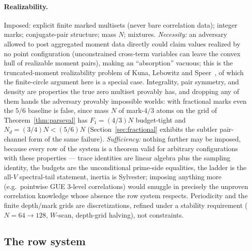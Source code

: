 \documentclass[11pt]{article}
\theoremstyle{plain}
\theoremstyle{definition}
\theoremstyle{remark}
\newcommand{\Nd}{N_{d}}
\begin{document}
\paragraph{Realizability.}
Imposed: explicit finite marked multisets (never bare correlation data); integer
marks; conjugate-pair structure; mass $N$; mixtures. \emph{Necessity:} an
adversary allowed to post aggregated moment data directly could claim values
realized by no point configuration (unconstrained cross-term variables can leave
the convex hull of realizable moment pairs), making an ``absorption'' vacuous;
this is the truncated-moment realizability problem of Kuna, Lebowitz and
Speer~\cite{KLS07,KLS11}, of which the finite-circle argument here is a special
case. Integrality, pair symmetry, and density are properties the true zero
multiset provably has, and dropping any of them hands the adversary provably
impossible worlds: with fractional marks even the $5/6$ baseline is false, since
mass $N$ of mark-$4/3$ atoms on the grid of Theorem~\ref{thm:parseval} has
$F_1 = (4/3) N$ budget-tight and $\Nd = (3/4) N < (5/6) N$
(Section~\ref{sec:fractional} exhibits the subtler pair-channel form of the same
failure). \emph{Sufficiency:} nothing further may be imposed, because every row of
the system is a theorem valid for arbitrary configurations with these properties
--- trace identities are linear algebra plus the sampling identity, the budgets
are the unconditional prime-side equalities, the ladder is the all-$V$
spectral-tail statement,
inertia is Sylvester; imposing anything more (e.g.\ pointwise GUE $3$-level
correlations) would smuggle in precisely the unproven correlation knowledge whose
absence the row system respects. Periodicity and the finite depth/mark grids are
discretizations, refined under a stability requirement
($N = 64 \to 128$, $W$-scan, depth-grid halving), not constraints.

\subsection{The row system}
\label{sec:rowsystem}
\end{document}
